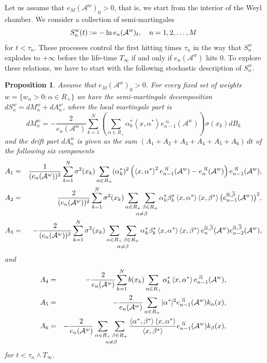 \documentclass{article}
\numberwithin{equation}{section}
\newcommand{\Aa}{\mathcal{A}^{w}}
\newcommand{\xas}{\left<x,\alpha^*\right>}
\newcommand{\xbs}{\left<x,\beta^*\right>}
\newcommand{\aR}{\alpha\in R_+}
\newcommand{\bR}{\beta\in R_+}
\newcommand{\SaR}{\sum_{\alpha\in R_+}}
\newcommand{\SanbR}{\mathop{\sum_{\aR}\sum_{\bR}}_{\alpha\neq \beta}}
\newcommand{\abs}{\left<\alpha^*,\beta^*\right>}
\newcommand{\shift}{\,\,}
\newcommand{\eA}[1]{e_{#1}(\Aa)}
\newcommand{\eaA}[1]{e_{#1}^{\shift\overline{\alpha}}(\Aa)}
\newcommand{\eabA}[1]{e_{#1}^{\overline{\alpha}, \overline{\beta}}(\Aa)}
\newcommand{\lifetime}{T_\infty}
\theoremstyle{plain}
\newtheorem{proposition}{Proposition}
\begin{document}
\bigskip

Let us assume that $\eA{M}_0>0$, that is, we start from the interior of the Weyl chamber. We consider a collection of semi-martingales
$$
	S_n^w(t) := -\ln \eA{n}_t\/,\quad n=1, 2,\ldots,M
$$
for $t<\tau_{n}$. These processes control the first hitting times $\tau_n$ in the way that $S_n^w$ explodes to $+\infty$ before the life-time $\lifetime$ if and only if $\eA{n}$ hits $0$. To explore these relations, we have to start with the following stochastic description of $S_n^w$.

\begin{proposition}
    \label{prop:Sn:SDE}
    Assume that $\eA{M}_0>0$. For every fixed set of weights $w = \{w_\alpha>0: \alpha\in R_+\}$ we have the semi-martingale decomposition $dS_n^w = dM_n^w+dA_n^w$, where the local martingale part is
    \begin{equation*}
	dM_n^w = -\dfrac{2}{\eA{n}}\sum_{k=1}^N\left(\sum_{\aR} \alpha_k^* \xas \eaA{n-1}\right)\sigma(x_k)dB_k
    \end{equation*}
 and the drift part $dA_n^w$ is given as the sum $(A_1+A_2+A_3+A_4+A_5+A_6)\,dt$ of the following six components 
    \begin{eqnarray}
        \label{S:A1:form}
	A_1 &=& \frac{1}{(\eA{n})^2}\sum_{k=1}^N \sigma^2(x_k)\SaR (\alpha_k^*)^2  \left(\xas^2\eaA{n-1}-\eaA{n}\right)\eaA{n-1}\/,\\
        \label{S:A2:form}
        A_2 &=& \frac{2}{(\eA{n})^2}\sum_{k=1}^N \sigma^2(x_k)\SanbR \alpha_k^* \beta_k^* \xas\xbs\big(\eabA{n-1}\big)^2\/,\\
        \label{S:A3:form}
        A_3 &=& -\frac{2}{(\eA{n})^2}\sum_{k=1}^N \sigma^2(x_k)\SanbR \alpha_k^* \beta_k^* \xas\xbs\eabA{n}\eabA{n-2}\/,
     \end{eqnarray}  
     and
     \begin{eqnarray}
	\label{S:A4:form}
        A_4 &=& - \frac{2}{\eA{n}}\sum_{k=1}^N b(x_k)\sum_{\aR}\alpha_k^* \xas \eaA{n-1}\/,\\
        \label{S:A5:form}
	A_5 &=&  - \frac{2}{\eA{n}}\sum_{\aR} |\alpha^*|^2\eaA{n-1}k_\alpha(x)\/,\\
        \label{S:A6:form}
	A_6 &=&  	- \frac{2}{\eA{n}}	\SanbR \frac{\abs\xas}{\xbs} \eaA{n-1}k_\beta(x)\/,	
    \end{eqnarray}
    for $t<\tau_n \wedge \lifetime$.
\end{proposition}
\end{document}
